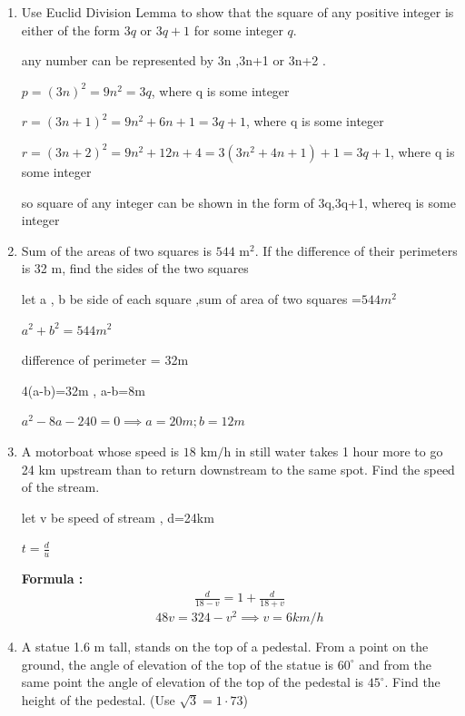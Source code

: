 \begin{enumerate}[label=\thesubsection.\arabic*, ref=\thesubsection.\theenumi]
	\item Use Euclid Division Lemma to show that the square of any positive integer is either of the form $3q$ or $3q+1$ for some integer $q$.
	
	\solution
	
	any number can be represented by 3n ,3n+1 or 3n+2 .
	
	$p=(3n)^2 = 9n^2 =3q $, where q is some integer 
	
	$r= (3n +1)^2 = 9n^2+6n +1= 3q+1 $, where q is some integer 
	
	$r=(3n+2)^2= 9n^2+ 12n+4= 3(3n^2+4n+1)+1= 3q+1$, where q is some integer 
	
	so square of any integer can be shown in the form of 3q,3q+1, whereq is some integer 
	
	\item  Sum of the areas of two squares is $544\text{ m}^{2}$. If the difference of their perimeters is 32 m, find the sides of the two squares
	
	\solution
	
	let a , b be side of each square ,sum of area of two squares =$544m^2$
	
	$a^2+b^2 = 544m^2$
	
	difference of perimeter = 32m
	
	4(a-b)=32m , a-b=8m 
	
	$a^2-8a-240 =0 \implies a=20m ;b=12m $
	
	\item 
	
	A motorboat whose speed is $18\text{ km/h}$ in still water takes 1 hour more to go 24 km upstream than to return downstream to the same spot. Find the speed of the stream. 
	
	\solution
	
	let v be speed of stream , d=24km 
	
	$t= \frac{d}{u}$
	
	\textbf{Formula :}
	\begin{align}
		\frac{d}{18-v}= 1+ \frac{d}{18+v}
	\end{align}
	$$48v=324-v^2\implies v=6km/h$$
	
	\item A statue 1.6 m tall, stands on the top of a pedestal. From a point on the ground, the angle of elevation of the top of the statue is $60^{\circ}$ and from the same point the angle of elevation of the top of the pedestal is $45^{\circ}$. Find the height of the pedestal. (Use $\sqrt{3} = 1\cdot73$)   
	

\end{enumerate}
